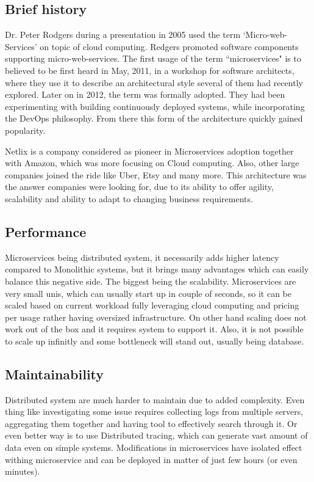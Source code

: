 \subsection{Brief history}
Dr. Peter Rodgers during a presentation in 2005 used the term `Micro-web-Services' on topic of cloud computing. Redgers promoted software components supporting micro-web-services. The first usage of the term ``microservices" is to believed to be first heard in May, 2011, in a workshop for software architects, where they use it to describe an architectural style several of them had recently explored. Later on in 2012, the term was formally adopted. They had been experimenting with building continuously deployed systems, while incorporating the DevOps philosophy. From there this form of the architecture quickly gained popularity. \cite{BRIEF_HISTORY_OF_MS}

Netlix is a company considered as pioneer in Microservices adoption together with Amazon, which was more focusing on Cloud computing. Also, other large companies joined the ride like Uber, Etsy and many more. This architecture was the answer companies were looking for, due to its ability to offer agility, scalability and ability to adapt to changing business requirements. \cite{MS_COMPANIES}



\subsection{Performance}
\label{section:microservices:performance}
Microservices being distributed system, it necessarily adds higher latency compared to Monolithic systems, but it brings many advantages which can easily balance this negative side. The biggest being the scalability. Microservices are very small unis, which can usually start up in couple of seconds, so it can be scaled based on current workload fully leveraging cloud computing and pricing per usage rather having oversized infrastructure. On other hand scaling does not work out of the box and it requires system to support it. Also, it is not possible to scale up infinitly and some bottleneck will stand out, usually being database.


\subsection{Maintainability}
Distributed system are much harder to maintain due to added complexity. Even thing like investigating some issue requires collecting logs from multiple servers, aggregating them together and having tool to effectively search through it. Or even better way is to use Distributed tracing, which can generate vast amount of data even on simple systems. Modifications in microservices have isolated effect withing microservice and can be deployed in matter of just few hours (or even minutes).

